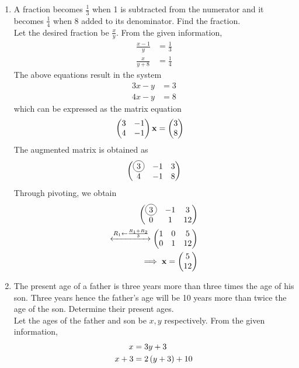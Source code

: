 \documentclass[journal,12pt,twocolumn]{IEEEtran}
\begin{document}
\begin{enumerate}
        \item A fraction becomes $\frac{1}{3}$ when 1 is subtracted from the numerator and it becomes $\frac{1}{4}$ when 8 added to its denominator. Find the fraction.\\
		\solution Let the desired fraction be $\frac{x}{y}$.  From the given information, 
		    \begin{align}
			    \frac{x-1}{y} &= \frac{1}{3}
			    \\
			    \frac{x}{y+8} &= \frac{1}{4}
		    \end{align}
		    The above equations result in the system 
		    \begin{align}
			    3x - y &= 3
			    \\
			    4x - y &= 8 
		    \end{align}
		    which can be expressed as the matrix equation 
		    \begin{align}
			    \begin{pmatrix}	    3 & -1  
			    \\
			    4 & -1\end{pmatrix} \mathbf{x} &= \begin{pmatrix}3\\8 \end{pmatrix}
		    \end{align}
		    The augmented matrix is obtained as 
		    \begin{align}
			    \myvec{	    \circled{3} & -1  &3
			    \\
			    4 & -1 & 8}  
		    \end{align}
		    Through pivoting, we obtain 
		    \begin{align}
			    \myvec{	    \circled{3} & -1  &3
			    \\
			    0 & 1 & 12}  
			    \\
			    \xleftrightarrow[]{R_1 \leftarrow \frac{R_1 + R_2}{3}}
			    \myvec{	    1 & 0  & 5
			    \\
			    0 & 1 & 12}  
			    \\
			    \implies \vec{x} = \myvec{5\\12}
		    \end{align}
        \item The present age of a father is three years more than three times the age of his son. Three years hence the father's age will be 10 years more than twice the age of the son. Determine their present ages.\\
		\solution Let the ages of the father and son be $x, y$ respectively.  From the given information, 
		    \begin{align}
			    x &= 3y+3
			    \\
			    x+3 &= 2\left(y+3\right) + 10
		    \end{align}

\end{enumerate}
\end{document}
